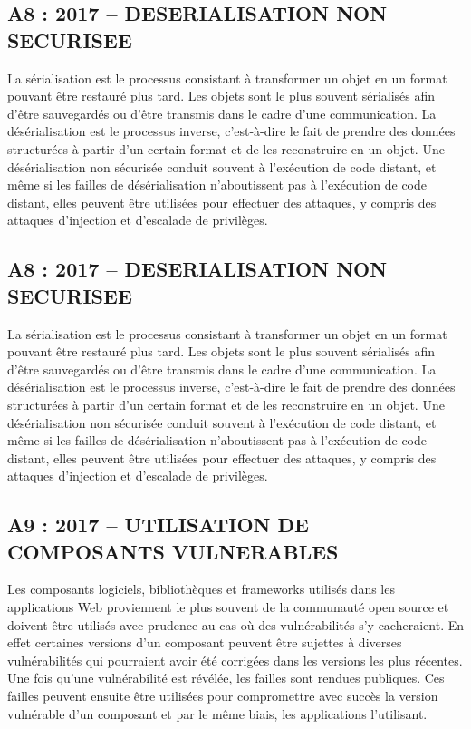 \subsection*{A8 : 2017 – DESERIALISATION NON SECURISEE}
La sérialisation est le processus consistant à transformer un objet en un format pouvant être restauré plus tard. Les objets sont le plus souvent sérialisés afin d’être sauvegardés ou d’être transmis dans le cadre d’une communication. La désérialisation est le processus inverse, c'est-à-dire le fait de prendre des données structurées à partir d'un certain format et de les reconstruire en un objet. Une désérialisation non sécurisée conduit souvent à l'exécution de code distant, et même si les failles de désérialisation n'aboutissent pas à l'exécution de code distant, elles peuvent être utilisées pour effectuer des attaques, y compris des attaques d'injection et d'escalade de privilèges.
\subsection*{A8 : 2017 – DESERIALISATION NON SECURISEE}
La sérialisation est le processus consistant à transformer un objet en un format pouvant être restauré plus tard. Les objets sont le plus souvent sérialisés afin d’être sauvegardés ou d’être transmis dans le cadre d’une communication. La désérialisation est le processus inverse, c'est-à-dire le fait de prendre des données structurées à partir d'un certain format et de les reconstruire en un objet. Une désérialisation non sécurisée conduit souvent à l'exécution de code distant, et même si les failles de désérialisation n'aboutissent pas à l'exécution de code distant, elles peuvent être utilisées pour effectuer des attaques, y compris des attaques d'injection et d'escalade de privilèges.
\subsection*{A9 : 2017 – UTILISATION DE COMPOSANTS VULNERABLES}
Les composants logiciels, bibliothèques et frameworks utilisés dans les applications Web proviennent le plus souvent de la communauté open source et doivent être utilisés avec prudence au cas où des vulnérabilités s’y cacheraient. En effet certaines versions d’un composant peuvent être sujettes à diverses vulnérabilités qui pourraient avoir été corrigées dans les versions les plus récentes. Une fois qu'une vulnérabilité est révélée, les failles sont rendues publiques. Ces failles peuvent ensuite être utilisées pour compromettre avec succès la version vulnérable d’un composant et par le même biais, les applications l’utilisant.

